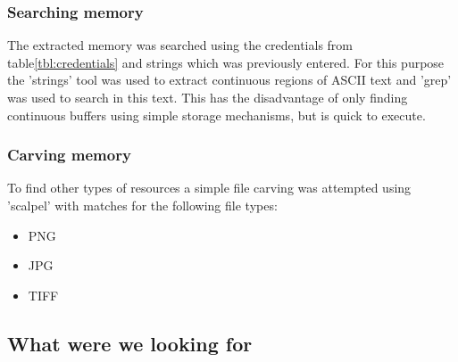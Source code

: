 \subsubsection{Searching memory}
The extracted memory was searched using the credentials from table\ref{tbl:credentials} and strings which was previously entered. For this purpose the 'strings' tool was used to extract continuous regions of ASCII text and 'grep' was used to search in this text. This has the disadvantage of only finding continuous buffers using simple storage mechanisms, but is quick to execute.

\subsubsection{Carving memory}
To find other types of resources a simple file carving was attempted using 'scalpel' with matches for the following file types:
\begin{itemize}
	\item PNG
	\item JPG
	\item TIFF
\end{itemize}

\subsection{What were we looking for}
\lipsum[7]
